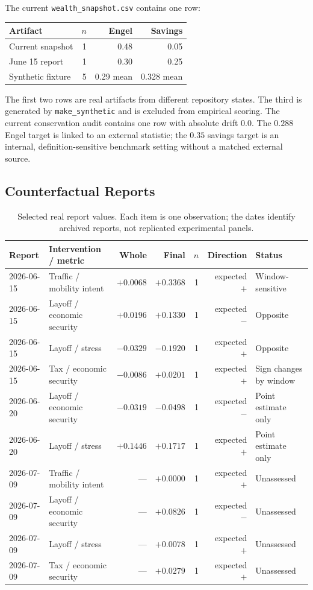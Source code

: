 \documentclass[letterpaper]{article}
\begin{document}
The current \texttt{wealth\_snapshot.csv} contains one row:
\begin{center}
\begin{tabular}{lrrr}
\toprule
Artifact & $n$ & Engel & Savings \\
\midrule
Current snapshot & 1 & 0.48 & 0.05 \\
June 15 report & 1 & 0.30 & 0.25 \\
Synthetic fixture & 5 & 0.29 mean & 0.328 mean \\
\bottomrule
\end{tabular}
\end{center}
The first two rows are real artifacts from different repository states. The third is generated by
\texttt{make\_synthetic} and is excluded from empirical scoring. The current conservation audit contains one row
with absolute drift $0.0$. The $0.288$ Engel target is linked to an external statistic; the $0.35$
savings target is an internal, definition-sensitive benchmark setting without a matched external source.

\subsection{Counterfactual Reports}

\begin{table}[t]
\centering
\footnotesize
\setlength{\tabcolsep}{4pt}
\caption{Selected real report values. Each item is one observation; the dates identify archived reports,
not replicated experimental panels.}
\begin{tabular}{llrrrrl}
\toprule
Report & Intervention / metric & Whole & Final & $n$ & Direction & Status \\
\midrule
2026-06-15 & Traffic / mobility intent & $+0.0068$ & $+0.3368$ & 1 & expected $+$ & Window-sensitive \\
2026-06-15 & Layoff / economic security & $+0.0196$ & $+0.1330$ & 1 & expected $-$ & Opposite \\
2026-06-15 & Layoff / stress & $-0.0329$ & $-0.1920$ & 1 & expected $+$ & Opposite \\
2026-06-15 & Tax / economic security & $-0.0086$ & $+0.0201$ & 1 & expected $+$ & Sign changes by window \\
2026-06-20 & Layoff / economic security & $-0.0319$ & $-0.0498$ & 1 & expected $-$ & Point estimate only \\
2026-06-20 & Layoff / stress & $+0.1446$ & $+0.1717$ & 1 & expected $+$ & Point estimate only \\
2026-07-09 & Traffic / mobility intent & --- & $+0.0000$ & 1 & expected $+$ & Unassessed \\
2026-07-09 & Layoff / economic security & --- & $+0.0826$ & 1 & expected $-$ & Unassessed \\
2026-07-09 & Layoff / stress & --- & $+0.0078$ & 1 & expected $+$ & Unassessed \\
2026-07-09 & Tax / economic security & --- & $+0.0279$ & 1 & expected $+$ & Unassessed \\
\bottomrule
\end{tabular}
\end{table}
\end{document}
